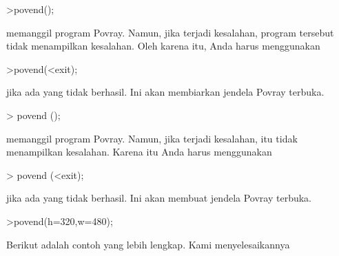 \documentclass{article}
\begin{document}
\begin{eulernotebook}
\begin{eulercomment}
\begin{eulercomment}
\begin{eulercomment}
\begin{eulercomment}
\begin{eulercomment}
\begin{eulercomment}
\begin{eulercomment}
\begin{eulercomment}
\begin{eulercomment}
\begin{eulercomment}
\begin{eulercomment}
\begin{eulercomment}
\begin{eulercomment}
\begin{eulercomment}
\begin{eulercomment}
\begin{eulercomment}
\begin{eulercomment}
\begin{eulercomment}
\begin{eulercomment}
\begin{eulercomment}
\begin{eulercomment}
\begin{eulercomment}
\begin{eulercomment}
\begin{eulercomment}
\begin{eulercomment}
\begin{eulercomment}
\begin{eulercomment}
\begin{eulercomment}
\begin{eulercomment}
\begin{eulercomment}
\begin{eulerttcomment}
 >povend();
\end{eulerttcomment}
\begin{eulercomment}
memanggil program Povray. Namun, jika terjadi kesalahan, program
tersebut tidak menampilkan kesalahan. Oleh karena itu, Anda harus
menggunakan

\end{eulercomment}
\begin{eulerttcomment}
 >povend(<exit);
\end{eulerttcomment}
\begin{eulercomment}

jika ada yang tidak berhasil. Ini akan membiarkan jendela Povray
terbuka.


\textgreater{} povend ();

memanggil program Povray. Namun, jika terjadi kesalahan, itu tidak
menampilkan kesalahan. Karena itu Anda harus menggunakan

\end{eulercomment}
\begin{eulerttcomment}
 > povend (<exit);
\end{eulerttcomment}
\begin{eulercomment}

jika ada yang tidak berhasil. Ini akan membuat jendela Povray terbuka.
\end{eulercomment}
\begin{eulerprompt}
>povend(h=320,w=480);
\end{eulerprompt}
\begin{eulercomment}
Berikut adalah contoh yang lebih lengkap. Kami menyelesaikannya


\end{eulercomment}
\end{eulercomment}
\end{eulercomment}
\end{eulercomment}
\end{eulercomment}
\end{eulercomment}
\end{eulercomment}
\end{eulercomment}
\end{eulercomment}
\end{eulercomment}
\end{eulercomment}
\end{eulercomment}
\end{eulercomment}
\end{eulercomment}
\end{eulercomment}
\end{eulercomment}
\end{eulercomment}
\end{eulercomment}
\end{eulercomment}
\end{eulercomment}
\end{eulercomment}
\end{eulercomment}
\end{eulercomment}
\end{eulercomment}
\end{eulercomment}
\end{eulercomment}
\end{eulercomment}
\end{eulercomment}
\end{eulercomment}
\end{eulercomment}
\end{eulercomment}
\end{eulernotebook}
\end{document}
